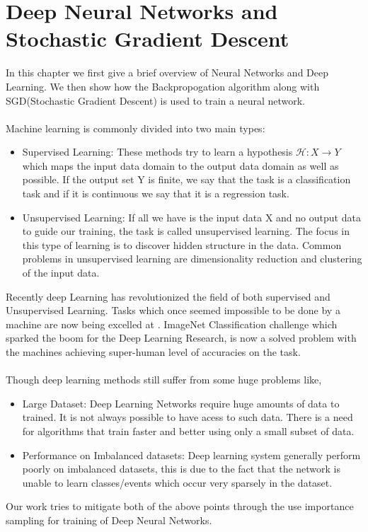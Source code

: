 \documentclass[a4paper,twoside]{iiththesis}
\theoremstyle{definition}
\theoremstyle{definition}
\theoremstyle{remark}
\begin{document}
\chapter{Deep Neural Networks and Stochastic Gradient Descent}
In this chapter we first give a brief overview of Neural Networks and Deep Learning. We then show how the Backpropogation algorithm along with SGD(Stochastic Gradient Descent) is used to train a neural network.
\\\\
Machine learning is commonly divided into two main types:
\begin{itemize}
\item Supervised Learning: These methods try to learn a hypothesis $\mathcal{H} : X \rightarrow Y$ which maps the input data domain to the output data domain as well as possible. If the output set Y is finite, we say that the task is a classification task and if it is continuous we say that it is a regression task.
\item Unsupervised Learning: If all we have is the input data X and no output data to guide our training, the task is called unsupervised learning. The focus in this type of learning is
to discover hidden structure in the data. Common problems in unsupervised learning are dimensionality reduction and clustering of the input data.
\end{itemize}

Recently deep Learning has revolutionized the field of both supervised 
and Unsupervised Learning. Tasks which once seemed impossible to be done by a machine are now being excelled at . ImageNet Classification challenge which sparked the boom for the Deep Learning Research, is now a solved problem with the machines achieving super-human level of accuracies on the task. \\ \\
Though deep learning methods still suffer from some huge problems like, 
\begin{itemize}
\item Large Dataset: Deep Learning Networks require huge amounts of data to trained. It is not always possible to have acess to such data. There is a need for algorithms that train faster and better using only a small subset of data.
\item Performance on Imbalanced datasets: Deep learning system generally perform poorly on imbalanced datasets, this is due to the fact that the network is unable to learn classes/events which occur very sparsely in the dataset.
\end{itemize}
Our work tries to mitigate both of the above points through the use importance sampling for training of Deep Neural Networks.
\end{document}
